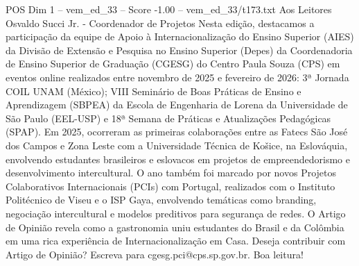 \begin{textsample}{POS Dim 1 – vem\_ed\_33 – Score -1.00 – vem\_ed\_33/t173.txt}  \label{ex:f1_pos_070}
Aos Leitores Osvaldo Succi Jr. - Coordenador de Projetos Nesta edição, destacamos a participação da equipe de Apoio à Internacionalização do Ensino Superior (AIES) da Divisão de Extensão e Pesquisa no Ensino Superior (Depes) da Coordenadoria de Ensino Superior de Graduação (CGESG) do Centro Paula Souza (CPS) em eventos online realizados entre novembro de 2025 e fevereiro de 2026: 3ª Jornada COIL UNAM (México); VIII Seminário de Boas Práticas de Ensino e Aprendizagem (SBPEA) da Escola de Engenharia de Lorena da Universidade de São Paulo (EEL-USP) e 18ª Semana de Práticas e Atualizações Pedagógicas (SPAP).
Em 2025, ocorreram as primeiras colaborações entre as Fatecs São José dos Campos e Zona Leste com a Universidade Técnica de Košice, na Eslováquia, envolvendo estudantes brasileiros e eslovacos em projetos de empreendedorismo e desenvolvimento intercultural.
O ano também foi marcado por novos Projetos Colaborativos Internacionais (PCIs) com Portugal, realizados com o Instituto Politécnico de Viseu e o ISP Gaya, envolvendo temáticas como branding, negociação intercultural e modelos preditivos para segurança de redes.
O Artigo de Opinião revela como a gastronomia uniu estudantes do Brasil e da Colômbia em uma rica experiência de Internacionalização em Casa.
Deseja contribuir com Artigo de Opinião?
Escreva para cgesg.pci@cps.sp.gov.br.
Boa leitura!

\end{textsample}
